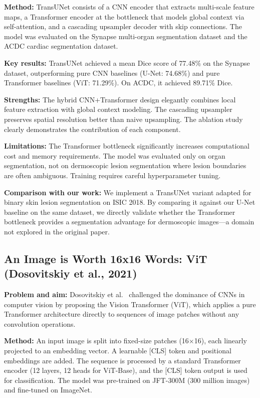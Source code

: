\documentclass[10pt,twocolumn]{article}
\begin{document}
\textbf{Method:} TransUNet consists of a CNN encoder that extracts multi-scale feature maps, a Transformer encoder at the bottleneck that models global context via self-attention, and a cascading upsampler decoder with skip connections. The model was evaluated on the Synapse multi-organ segmentation dataset and the ACDC cardiac segmentation dataset.

\textbf{Key results:} TransUNet achieved a mean Dice score of 77.48\% on the Synapse dataset, outperforming pure CNN baselines (U-Net: 74.68\%) and pure Transformer baselines (ViT: 71.29\%). On ACDC, it achieved 89.71\% Dice.

\textbf{Strengths:} The hybrid CNN+Transformer design elegantly combines local feature extraction with global context modeling. The cascading upsampler preserves spatial resolution better than naive upsampling. The ablation study clearly demonstrates the contribution of each component.

\textbf{Limitations:} The Transformer bottleneck significantly increases computational cost and memory requirements. The model was evaluated only on organ segmentation, not on dermoscopic lesion segmentation where lesion boundaries are often ambiguous. Training requires careful hyperparameter tuning.

\textbf{Comparison with our work:} We implement a TransUNet variant adapted for binary skin lesion segmentation on ISIC 2018. By comparing it against our U-Net baseline on the same dataset, we directly validate whether the Transformer bottleneck provides a segmentation advantage for dermoscopic images---a domain not explored in the original paper.

\subsection{An Image is Worth 16x16 Words: ViT (Dosovitskiy et al., 2021)}

\textbf{Problem and aim:} Dosovitskiy et al.\ \cite{Dosovitskiy2021} challenged the dominance of CNNs in computer vision by proposing the Vision Transformer (ViT), which applies a pure Transformer architecture directly to sequences of image patches without any convolution operations.

\textbf{Method:} An input image is split into fixed-size patches (16$\times$16), each linearly projected to an embedding vector. A learnable [CLS] token and positional embeddings are added. The sequence is processed by a standard Transformer encoder (12 layers, 12 heads for ViT-Base), and the [CLS] token output is used for classification. The model was pre-trained on JFT-300M (300 million images) and fine-tuned on ImageNet.
\end{document}
